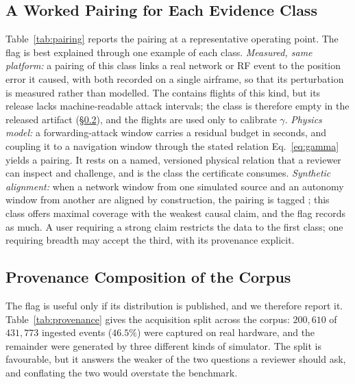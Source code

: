 \begin{table}[t]
\centering
\caption{A representative cross-layer pairing, in which a detector-evading
time-delay attack still induces measurable navigation staleness. Values are
from the released artifact (harness simulation; $\gamma$ at its per-sample
supremum; benchmark MCR).}
\label{tab:pairing}
\small
\renewcommand{\arraystretch}{1.05}

\end{table}

\subsection{A Worked Pairing for Each Evidence Class}
Table~\ref{tab:pairing} reports the pairing at a representative operating point.
The  flag is best explained through one example of each
class. \emph{Measured, same platform:} a pairing of this class links a real
network or RF event to the position error it caused, with both recorded on a
single airframe, so that its perturbation is measured rather than modelled. The
 contains flights of this kind, but its release
lacks machine-readable attack intervals; the class is therefore empty in the
released artifact (\S\ref{sec:provenance_dist}), and the flights are used only
to calibrate $\gamma$.
\emph{Physics model:} a forwarding-attack window carries a residual budget in
seconds, and coupling it to a navigation window through the stated relation
Eq.~\eqref{eq:gamma} yields a  pairing. It rests on a
named, versioned physical relation that a reviewer can inspect and challenge,
and is the class the certificate consumes. \emph{Synthetic
alignment:} when a network window from one simulated source and an autonomy
window from another are aligned by construction, the pairing is tagged
; this class offers maximal coverage with the
weakest causal claim, and the flag records as much. A user requiring a
strong claim restricts the data to the first class; one requiring breadth may
accept the third, with its provenance explicit.

\subsection{Provenance Composition of the Corpus}
\label{sec:provenance_dist}
The flag is useful only if its distribution is published, and we therefore report
it. Table~\ref{tab:provenance} gives the acquisition split across
the corpus: $200{,}610$ of $431{,}773$ ingested events ($46.5\%$) were
captured on real hardware, and the remainder were generated by three different
kinds of simulator. The split is favourable, but it answers the weaker of the
two questions a reviewer should ask, and conflating the two would overstate the
benchmark.


